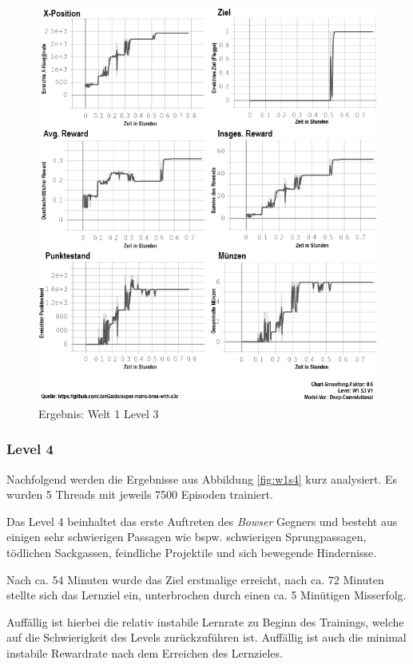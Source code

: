\documentclass[sigconf,nonacm]{acmart}
\begin{document}
\begin{figure}[hbt!]
\includegraphics[width=\columnwidth]{images/stats_w1s3v0_dcn.png}
\caption{Ergebnis: Welt 1 Level 3}
\label{fig:w1s3}
\end{figure}

\subsubsection{Level 4}\hfill \break

Nachfolgend werden die Ergebnisse aus Abbildung \ref{fig:w1s4} kurz analysiert. Es wurden 5 Threads mit jeweils 7500 Episoden trainiert.

Das Level 4 beinhaltet das erste Auftreten des \textit{Bowser} Gegners und besteht aus einigen sehr schwierigen Passagen wie bspw. schwierigen Sprungpassagen, tödlichen Sackgassen, feindliche Projektile und sich bewegende Hindernisse.

Nach ca. 54 Minuten wurde das Ziel erstmalige erreicht, nach ca. 72 Minuten stellte sich das Lernziel ein, unterbrochen durch einen ca. 5 Minütigen Misserfolg.

Auffällig ist hierbei die relativ instabile Lernrate zu Beginn des Trainings, welche auf die Schwierigkeit des Levels zurückzuführen ist. Auffällig ist auch die minimal instabile Rewardrate nach dem Erreichen des Lernzieles.
\end{document}
